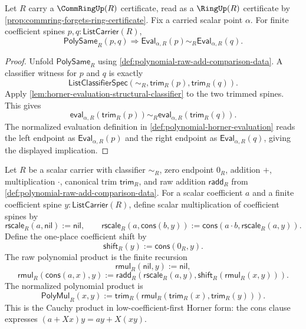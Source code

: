 \begin{theorem}
\label{thm:polynomial-evaluation-respects-polynomial-classifier}
Let $R$ carry a $\CommRingUp(R)$ certificate, read as a $\RingUp(R)$ certificate by \autoref{prop:commring-forgets-ring-certificate}. Fix a carried scalar point $\alpha$. For finite coefficient spines $p,q:\mathsf{ListCarrier}(R)$,
$$
\mathsf{PolySame}_R(p,q)
\Longrightarrow
\mathsf{Eval}_{\alpha,R}(p)\sim_R\mathsf{Eval}_{\alpha,R}(q).
$$
\end{theorem}
\begin{proof}
Unfold $\mathsf{PolySame}_R$ using \autoref{def:polynomial-raw-add-comparison-data}. A classifier witness for $p$ and $q$ is exactly
$$
\mathsf{ListClassifierSpec}(\sim_R,\mathsf{trim}_R(p),\mathsf{trim}_R(q)).
$$
Apply \autoref{lem:horner-evaluation-structural-classifier} to the two trimmed spines. This gives
$$
\mathsf{eval}_{\alpha,R}(\mathsf{trim}_R(p))\sim_R
\mathsf{eval}_{\alpha,R}(\mathsf{trim}_R(q)).
$$
The normalized evaluation definition in \autoref{def:polynomial-horner-evaluation} reads the left endpoint as $\mathsf{Eval}_{\alpha,R}(p)$ and the right endpoint as $\mathsf{Eval}_{\alpha,R}(q)$, giving the displayed implication.
\end{proof}

\begin{definition}
\label{def:polynomial-raw-cauchy-product}
Let $R$ be a scalar carrier with classifier $\sim_R$, zero endpoint $0_R$, addition $+$, multiplication $\cdot$, canonical trim $\mathsf{trim}_R$, and raw addition $\mathsf{radd}_R$ from \autoref{def:polynomial-raw-add-comparison-data}. For a scalar coefficient $a$ and a finite coefficient spine $y:\mathsf{ListCarrier}(R)$, define scalar multiplication of coefficient spines by
$$
\mathsf{rscale}_R(a,\mathsf{nil}):=\mathsf{nil},
\qquad
\mathsf{rscale}_R(a,\mathsf{cons}(b,y)):=\mathsf{cons}(a\cdot b,\mathsf{rscale}_R(a,y)).
$$
Define the one-place coefficient shift by
$$
\mathsf{shift}_R(y):=\mathsf{cons}(0_R,y).
$$
The raw polynomial product is the finite recursion
$$
\mathsf{rmul}_R(\mathsf{nil},y):=\mathsf{nil},
$$
$$
\mathsf{rmul}_R(\mathsf{cons}(a,x),y):=
\mathsf{radd}_R(\mathsf{rscale}_R(a,y),\mathsf{shift}_R(\mathsf{rmul}_R(x,y))).
$$
The normalized polynomial product is
$$
\mathsf{PolyMul}_R(x,y):=\mathsf{trim}_R(\mathsf{rmul}_R(\mathsf{trim}_R(x),\mathsf{trim}_R(y))).
$$
This is the Cauchy product in low-coefficient-first Horner form: the cons clause expresses $(a+Xx)y=ay+X(xy)$.
\end{definition}

